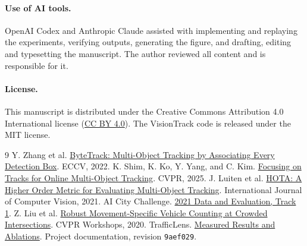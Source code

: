 \documentclass[11pt]{article}
\begin{document}
\paragraph{Use of AI tools.} OpenAI Codex and Anthropic Claude assisted with implementing and replaying the experiments, verifying outputs, generating the figure, and drafting, editing and typesetting the manuscript. The author reviewed all content and is responsible for it.

\paragraph{License.} This manuscript is distributed under the Creative Commons Attribution 4.0 International license (\href{https://creativecommons.org/licenses/by/4.0/}{CC BY 4.0}). The VisionTrack code is released under the MIT license.

\begin{thebibliography}{9}
\small
{}
Y. Zhang et al. \href{https://arxiv.org/abs/2110.06864}{ByteTrack: Multi-Object Tracking by Associating Every Detection Box}. ECCV, 2022.
K. Shim, K. Ko, Y. Yang, and C. Kim. \href{https://openaccess.thecvf.com/content/CVPR2025/html/Shim_Focusing_on_Tracks_for_Online_Multi-Object_Tracking_CVPR_2025_paper.html}{Focusing on Tracks for Online Multi-Object Tracking}. CVPR, 2025.
J. Luiten et al. \href{https://pmc.ncbi.nlm.nih.gov/articles/PMC7881978/}{HOTA: A Higher Order Metric for Evaluating Multi-Object Tracking}. International Journal of Computer Vision, 2021.
AI City Challenge. \href{https://www.aicitychallenge.org/2021-data-and-evaluation/}{2021 Data and Evaluation, Track 1}.
Z. Liu et al. \href{https://openaccess.thecvf.com/content_CVPRW_2020/papers/w35/Liu_Robust_Movement-Specific_Vehicle_Counting_at_Crowded_Intersections_CVPRW_2020_paper.pdf}{Robust Movement-Specific Vehicle Counting at Crowded Intersections}. CVPR Workshops, 2020.
TrafficLens. \href{https://github.com/safdar-hussain1/trafficlens/blob/9aef029c68a9c7dc4c0f112085418483ddbb985c/README.md\#measured-results}{Measured Results and Ablations}. Project documentation, revision \texttt{9aef029}.
\end{thebibliography}
\end{document}
